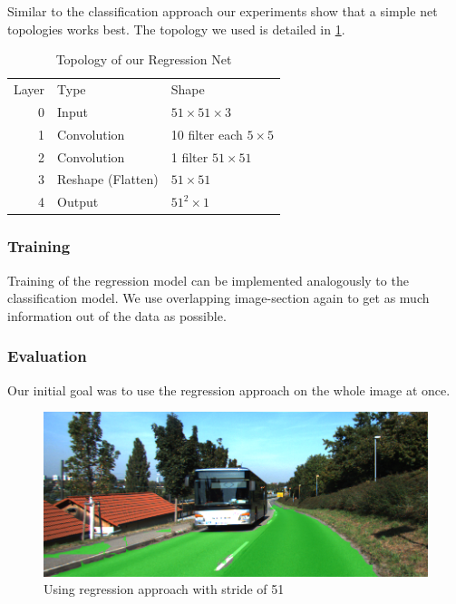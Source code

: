 Similar to the classification approach our experiments show that a simple net topologies works best. The topology we used is detailed in \cref{tab:topo2}.

\begin{table}[H]
	\normalsize
	\centering
	\begin{tabular}{r l l}
		Layer & Type  & Shape  \\
		0     & Input &  $51 \times 51 \times 3$ \\
		1     & Convolution & 10 filter  each $5 \times 5$ \\
		2     & Convolution & 1 filter $51 \times 51$  \\
		3     & Reshape (Flatten) & $51 \times 51$ \\
		4     & Output     & $51^2 \times 1$ \\
	\end{tabular}
	\caption{Topology of our Regression Net}
	\label{tab:topo2}
\end{table} 

\subsubsection{Training}

Training of the regression model can be implemented analogously to the classification model. We use overlapping image-section again to get as much information out of the data as possible.

\subsubsection{Evaluation}

Our initial goal was to use the regression approach on the whole image at once. 

\begin{figure}[]
	\centering
	\includegraphics[width=\columnwidth]{figures/models/testing2-um_32_conv_stride51.png}
	\caption{Using regression approach with stride of 51}
	\label{fig:reg_stride2}
\end{figure} 



